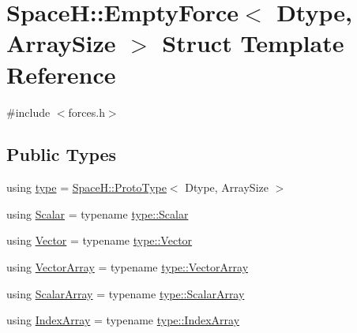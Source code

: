 \hypertarget{struct_space_h_1_1_empty_force}{}\section{SpaceH\+:\+:Empty\+Force$<$ Dtype, Array\+Size $>$ Struct Template Reference}
\label{struct_space_h_1_1_empty_force}


{\ttfamily \#include $<$forces.\+h$>$}

\subsection*{Public Types}
\begin{DoxyCompactItemize}
\item 
using \mbox{\hyperlink{struct_space_h_1_1_empty_force_a87b62085a73d95239597b9e88ff5e32a}{type}} = \mbox{\hyperlink{struct_space_h_1_1_proto_type}{Space\+H\+::\+Proto\+Type}}$<$ Dtype, Array\+Size $>$
\item 
using \mbox{\hyperlink{struct_space_h_1_1_empty_force_a708ead350efe0aa6f7bf1c0909ee6f28}{Scalar}} = typename \mbox{\hyperlink{struct_space_h_1_1_proto_type_af3c8245d83d9db64749882920de5c274}{type\+::\+Scalar}}
\item 
using \mbox{\hyperlink{struct_space_h_1_1_empty_force_abfd8a2b724383a3a2dde191d95ca0661}{Vector}} = typename \mbox{\hyperlink{struct_space_h_1_1_proto_type_a316b81f4660b2b4fab14a8e1f23b6089}{type\+::\+Vector}}
\item 
using \mbox{\hyperlink{struct_space_h_1_1_empty_force_a06ad868879a6fa5def9c7f9fd75fffde}{Vector\+Array}} = typename \mbox{\hyperlink{struct_space_h_1_1_proto_type_a622b8e122b33bb4966a02299fb7b82d6}{type\+::\+Vector\+Array}}
\item 
using \mbox{\hyperlink{struct_space_h_1_1_empty_force_afdeb66410650cdb1e2e3b1e1fd79540c}{Scalar\+Array}} = typename \mbox{\hyperlink{struct_space_h_1_1_proto_type_a09ef91dc8a37a044c403f5a833044725}{type\+::\+Scalar\+Array}}
\item 
using \mbox{\hyperlink{struct_space_h_1_1_empty_force_a25e0bd933dd3715e315c1abdb6843c36}{Index\+Array}} = typename \mbox{\hyperlink{struct_space_h_1_1_proto_type_a276a37c81faf08681b57e8082f3f6c1b}{type\+::\+Index\+Array}}
\end{DoxyCompactItemize}
